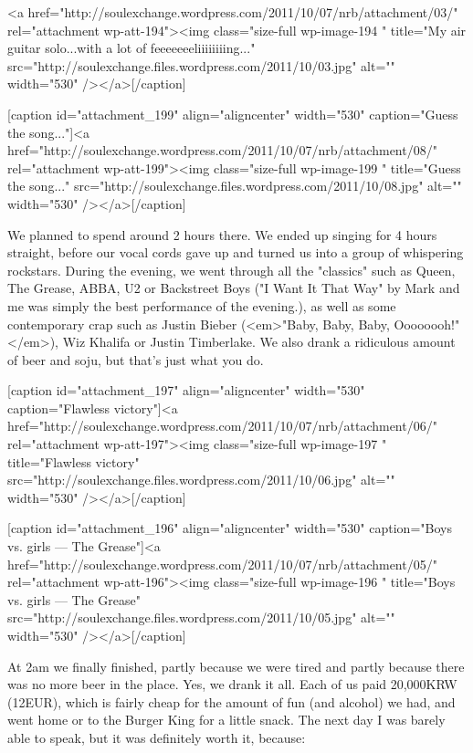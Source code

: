 \begin{post}
\begin{content}
[caption id="attachment_194" align="aligncenter" width="530" caption="My air guitar solo...with a lot of feeeeeeeliiiiiiiing..."]<a href="http://soulexchange.wordpress.com/2011/10/07/nrb/attachment/03/" rel="attachment wp-att-194"><img class="size-full wp-image-194 " title="My air guitar solo...with a lot of feeeeeeeliiiiiiiing..." src="http://soulexchange.files.wordpress.com/2011/10/03.jpg" alt="" width="530" /></a>[/caption]



[caption id="attachment_199" align="aligncenter" width="530" caption="Guess the song..."]<a href="http://soulexchange.wordpress.com/2011/10/07/nrb/attachment/08/" rel="attachment wp-att-199"><img class="size-full wp-image-199 " title="Guess the song..." src="http://soulexchange.files.wordpress.com/2011/10/08.jpg" alt="" width="530" /></a>[/caption]



We planned to spend around 2 hours there. We ended up singing for 4 hours straight, before our vocal cords gave up and turned us into a group of whispering rockstars. During the evening, we went through all the "classics" such as Queen, The Grease, ABBA, U2 or Backstreet Boys ("I Want It That Way" by Mark and me was simply the best performance of the evening.), as well as some contemporary crap such as Justin Bieber (<em>"Baby, Baby, Baby, Oooooooh!"</em>), Wiz Khalifa or Justin Timberlake. We also drank a ridiculous amount of beer and soju, but that's just what you do.



[caption id="attachment_197" align="aligncenter" width="530" caption="Flawless victory"]<a href="http://soulexchange.wordpress.com/2011/10/07/nrb/attachment/06/" rel="attachment wp-att-197"><img class="size-full wp-image-197 " title="Flawless victory" src="http://soulexchange.files.wordpress.com/2011/10/06.jpg" alt="" width="530" /></a>[/caption]



[caption id="attachment_196" align="aligncenter" width="530" caption="Boys vs. girls — The Grease"]<a href="http://soulexchange.wordpress.com/2011/10/07/nrb/attachment/05/" rel="attachment wp-att-196"><img class="size-full wp-image-196 " title="Boys vs. girls — The Grease" src="http://soulexchange.files.wordpress.com/2011/10/05.jpg" alt="" width="530" /></a>[/caption]



At 2am we finally finished, partly because we were tired and partly because there was no more beer in the place. Yes, we drank it all. Each of us paid 20,000KRW (12EUR), which is fairly cheap for the amount of fun (and alcohol) we had, and went home or to the Burger King for a little snack. The next day I was barely able to speak, but it was definitely worth it, because:


\end{content}
\end{post}
